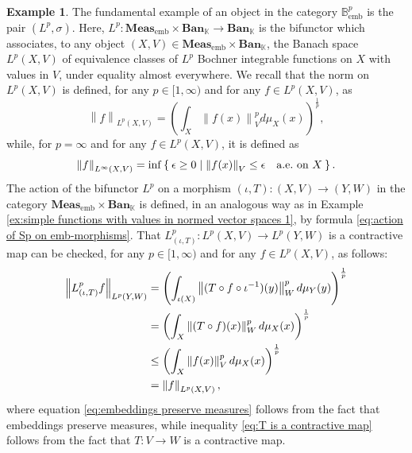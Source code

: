 \documentclass{amsart}
\theoremstyle{definition}
\newtheorem{example}[definition]{Example}
\theoremstyle{plain}
\newcommand{\norm}[1]{\left\lVert #1\right\rVert} %
\newcommand{\embMeas}{\mathbf{Meas}_\mathrm{emb}}
\newcommand{\Ban}{\mathbf{Ban}_{\mathbb{K}}}
\newcommand{\Bembp}{\mathbb{B}_{\mathrm{emb}}^p}
\begin{document}
        \begin{example}
        \label{ex:Lpemb functor}
            The fundamental example of an object in the category $\Bembp$ is the pair $(L^p,\sigma)$.
            Here, $L^p \colon \embMeas \times \Ban \rightarrow \Ban$ is the bifunctor which associates, to any object $(X,V) \in \embMeas \times \Ban$, the Banach space $L^p(X,V)$ of equivalence classes of $L^p$ Bochner integrable functions on $X$ with values in $V$, under equality almost everywhere. 
            We recall that the norm on $L^p(X,V)$ is defined, for any $p \in [1,\infty)$ and for any $f \in L^p(X,V)$, as
            \begin{equation}
            \label{eq:Lp norm}
                \norm{f}_{L^p(X,V)} = \left( \int_X \norm{f(x)}_V^p d\mu_{X}(x) \right)^{\frac{1}{p}},
            \end{equation}
            while, for $p = \infty$ and for any $f \in L^p(X,V)$, it is defined as
            \begin{equation}
            \label{eq:Linfty norm}
                \norm{f}_{L^\infty(X,V)} = \inf \Set{\epsilon \geq 0 | \norm{f(x)}_V \leq \epsilon \quad \text{a.e.~on} ~ X}.
            \end{equation}
            The action of the bifunctor $L^p$ on a morphism $(\iota,T) \colon (X,V) \rightarrow (Y,W)$ in the category $\embMeas \times \Ban$ is defined, in an analogous way as in Example \ref{ex:simple functions with values in normed vector spaces 1}, by formula \eqref{eq:action of Sp on emb-morphisms}.
            That $L^p_{(\iota,T)} \colon L^p(X,V) \rightarrow L^p(Y,W)$ is a contractive map can be checked, for any $p \in [1,\infty)$ and for any $f \in L^p(X,V)$, as follows:
            \begin{align}
                \norm{L^p_{(\iota,T)} f}_{L^p(Y,W)} &= \left( \int_{\iota(X)} \norm{(T \circ f \circ \iota^{-1})(y)}_W^p d\mu_{Y}(y) \right)^{\frac{1}{p}} \notag \\
                &= \left( \int_{X} \norm{(T \circ f)(x)}_W^p d\mu_{X}(x) \right)^{\frac{1}{p}} \label{eq:embeddings preserve measures} \\
                &\leq \left( \int_{X} \norm{f(x)}_V^p d\mu_{X}(x) \right)^{\frac{1}{p}} \label{eq:T is a contractive map} \\
                &= \norm{f}_{L^p(X,V)}, \notag
            \end{align}
            where equation \eqref{eq:embeddings preserve measures} follows from the fact that embeddings preserve measures, while inequality \eqref{eq:T is a contractive map} follows from the fact that $T \colon V \rightarrow W$ is a contractive map.

\end{example}
\end{document}
